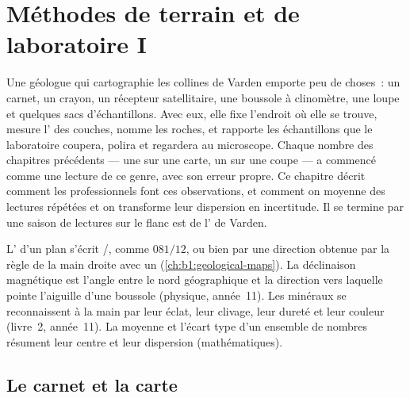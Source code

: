 \chapter{Méthodes de terrain et de laboratoire I}\label{ch:b1:field-lab-methods-1}

Une géologue qui cartographie les collines de Varden emporte peu de choses~: un
carnet, un crayon, un récepteur satellitaire, une boussole à clinomètre, une
loupe et quelques sacs d'échantillons. Avec eux, elle fixe l'endroit où elle se
trouve, mesure l' des couches, nomme les roches, et rapporte les
échantillons que le laboratoire coupera, polira et regardera au microscope.
Chaque nombre des chapitres précédents --- une  sur une carte, un
 sur une coupe --- a commencé comme une lecture de ce genre, avec son
erreur propre. Ce chapitre décrit comment les professionnels font ces
observations, et comment on moyenne des lectures répétées et on transforme leur
dispersion en incertitude. Il se termine par une saison de lectures sur le flanc
est de l' de Varden.

\begin{recall}
L' d'un plan s'écrit /, comme $081/12$, ou bien par
une direction obtenue par la règle de la main droite avec un 
(\cref{ch:b1:geological-maps}). La déclinaison magnétique est l'angle entre le
nord géographique et la direction vers laquelle pointe l'aiguille d'une boussole
(physique, année~11). Les minéraux se reconnaissent à la main par leur éclat,
leur clivage, leur dureté et leur couleur (livre~2, année~11). La moyenne et
l'écart type d'un ensemble de nombres résument leur centre et leur dispersion
(mathématiques).
\end{recall}

\section{Le carnet et la carte}

